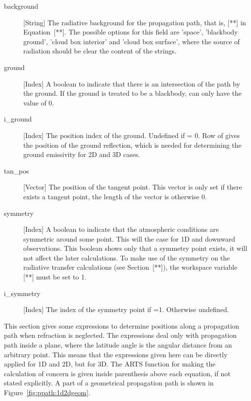 \begin{description}
   \item[background] [String] The radiative background for the
     propagation path, that is, [**] in Equation~[**]. The possible
     options for this field are 'space', 'blackbody ground', 'cloud
     box interior' and 'cloud box surface', where the source of
     radiation should be clear the content of the strings.

  \item[ground] [Index] A boolean to indicate that there is an intersection
     of the path by the ground. If the ground is treated to be a blackbody,
      can only have the value of 0.
     
   \item[i\_ground] [Index] The position index of the ground.
     Undefined if  = 0. Row  of
      gives the position of the ground reflection, which
     is needed for determining the ground emissivity for 2D and 3D cases.

  \item[tan\_pos] [Vector] The position of the tangent point. This vector is
      only set if there exists a tangent point, the length of the vector is
      otherwise 0. 
     
   \item[symmetry] [Index] A boolean to indicate that the atmospheric
     conditions are symmetric around some point. This will the case
     for 1D and downward observations. This boolean shows only that a
     symmetry point exists, it will not affect the later calculations.
     To make use of the symmetry on the radiative transfer
     calculations (see Section~[**]), the workspace variable [**] must
     be set to 1. 

   \item[i\_symmetry] [Index] The index of the symmetry point if 
     =1. Otherwise undefined.

\end{description}




\label{sec:ppath:basicgeom}

This section gives some expressions to determine positions along a
propagation path when refraction is neglected. The expressions deal
only with propagation path inside a plane, where the latitude angle is
the angular distance from an arbitrary point. This means that the
expressions given here can be directly applied for 1D and 2D, but for
3D. The ARTS function for making the calculation of concern is given
inside parenthesis above each equation, if not stated explicitly. A
part of a geometrical propagation path is shown in
Figure~\ref{fig:ppath:1d2dgeom}.

